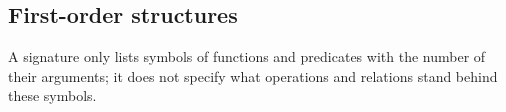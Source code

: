 \subsection{First-order structures}
A signature only lists symbols of functions and predicates with the number of their arguments;
it does not specify what operations and relations stand behind these symbols.
